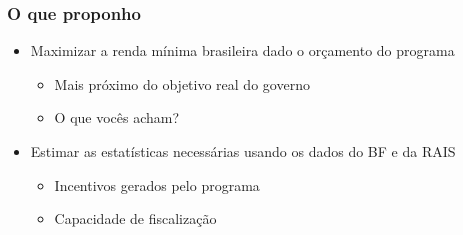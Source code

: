 \documentclass[xcolor=pdftex,dvipsnames,table]{beamer}
\begin{document}
\begin{frame}[label=literature]
 \frametitle{O que proponho}
\begin{itemize}
\item Maximizar a renda m\'inima brasileira dado o or\c{c}amento do programa
\begin{itemize}
\item Mais pr\'oximo do objetivo real do governo
\item O que voc\^es acham?
\end{itemize}
\pause
\item Estimar as estat\'isticas necess\'arias usando os dados do BF e da RAIS
\begin{itemize}
\item Incentivos gerados pelo programa
\item Capacidade de fiscaliza\c{c}\~ao 
\end{itemize}
\end{itemize}
\end{frame}
\end{document}

